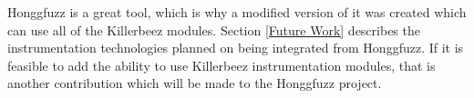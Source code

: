 Honggfuzz is a great tool, which is why a modified version of it was created
which can use all of the Killerbeez modules.\cite{honggfuzzgrimm} Section
\ref{Future Work} describes the instrumentation technologies planned on being
integrated from Honggfuzz. If it is feasible to add the ability to use
Killerbeez instrumentation modules, that is another contribution which will be
made to the Honggfuzz project.
